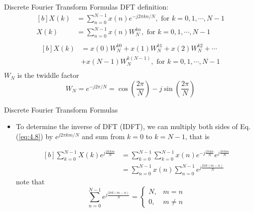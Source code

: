 \documentclass[pdflatex,compress,mathserif]{beamer}
\begin{document}
\begin{frame}{Discrete Fourier Transform Formulas}
    DFT definition:
    \begin{equation}
        \begin{aligned}[b]
            X(k) &= \sum_{n=0}^{N-1} x(n)e^{-j2\pi kn / N},\text{ for } k = 0,1, \cdots, N-1 \\
            X(k) &= \sum_{n=0}^{N-1} x(n)W_N^{kn},\text{ for } k = 0,1, \cdots, N-1 \\
        \end{aligned}
        \label{eq:4.8}
    \end{equation}
    \begin{equation}
        \begin{aligned}[b]
            X(k) &= x(0)W_N^{k0} + x(1)W_N^{k1} + x(2)W_N^{k2} + \cdots \\
            &+ x(N-1)W_N^{k(N-1)},\text{ for } k = 0,1, \cdots, N-1 \\
        \end{aligned}
    \end{equation}
    $W_N$ is the twiddle factor
    \begin{equation}
        W_N = e^{-j2\pi /N} = \cos(\frac{2\pi}{N}) - j\sin(\frac{2\pi}{N})
    \end{equation}
\end{frame}

\begin{frame}{Discrete Fourier Transform Formulas}
    \begin{itemize}
        \item To determine the inverse of DFT (IDFT), we can multiply both sides of Eq. (\ref{eq:4.8}) by $e^{j2 \pi k m /N}$ and sum from $k = 0$ to $k = N - 1$, that is
        
        \begin{equation}
            \begin{aligned}[b]
                \sum_{k=0}^{N-1} X(k)e^{j\frac{2\pi km}{N}} &= \sum_{k=0}^{N-1} \sum_{k=0}^{N-1} x(n)e^{-j\frac{2\pi kn}{N}}e^{j\frac{2\pi km}{N}} \\
                &= \sum_{n=0}^{N-1} x(n) \sum_{n=0}^{N-1} e^{j\frac{2\pi k(m-n)}{N}}
            \end{aligned}
            \label{eq:4.11}
        \end{equation}
        note that
        \begin{equation}
            \sum_{n=0}^{N-1} e^{j\frac{2\pi k(m-n)}{N}} = \begin{cases}
                N,& m = n\\
                0,& m \neq n
            \end{cases}
        \end{equation}
    \end{itemize}
\end{frame}
\end{document}
